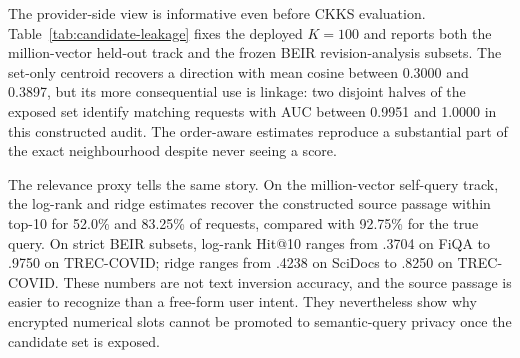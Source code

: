 \documentclass[pdflatex,sn-basic,Numbered]{sn-jnl}
\theoremstyle{plain}
\begin{document}
The provider-side view is informative even before CKKS evaluation. Table~\ref{tab:candidate-leakage} fixes the deployed $K=100$ and reports both the million-vector held-out track and the frozen BEIR revision-analysis subsets. The set-only centroid recovers a direction with mean cosine between 0.3000 and 0.3897, but its more consequential use is linkage: two disjoint halves of the exposed set identify matching requests with AUC between 0.9951 and 1.0000 in this constructed audit. The order-aware estimates reproduce a substantial part of the exact neighbourhood despite never seeing a score.

\begin{table}[t]
\caption{Semantic information retained by exposed $K=100$ candidate IDs. The provider uses only its exact vectors for those IDs. ``Set'' is the order-free centroid; the other columns use the disclosed order. Overlap is the fraction of the true exact top-10 recovered by the estimated query.}\label{tab:candidate-leakage}
\centering
\small
{}
\end{table}

The relevance proxy tells the same story. On the million-vector self-query track, the log-rank and ridge estimates recover the constructed source passage within top-10 for 52.0\% and 83.25\% of requests, compared with 92.75\% for the true query. On strict BEIR subsets, log-rank Hit@10 ranges from .3704 on FiQA to .9750 on TREC-COVID; ridge ranges from .4238 on SciDocs to .8250 on TREC-COVID. These numbers are not text inversion accuracy, and the source passage is easier to recognize than a free-form user intent. They nevertheless show why encrypted numerical slots cannot be promoted to semantic-query privacy once the candidate set is exposed.
\end{document}

